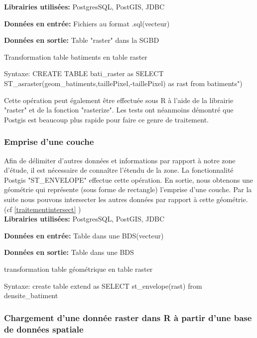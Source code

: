 \textbf{Librairies utilisées:} PostgresSQL, PostGIS, JDBC 

\textbf{Données en entrée:}  Fichiers au format .sql(vecteur)

\textbf{Données en sortie:} Table "raster" dans la SGBD \\

\begin{algorithm}[H]
\caption{\label{traitement6} Transformation table batiments en table raster}
Syntaxe:
CREATE TABLE bati\_raster as SELECT ST\_asraster(geom\_batiments,taillePixel,-taillePixel)  as rast from batiments")\\
\end{algorithm}

Cette opération peut également être effectuée sous R à l'aide de la librairie "raster" et de la fonction "rasterize". Les tests ont néanmoins démontré que Postgis est beaucoup plus rapide pour faire ce genre de traitement.

\subsubsection{Emprise d'une couche}

Afin de délimiter d'autres données et informations par rapport à notre zone d'étude, il est nécessaire de connaître l'étendu de la zone. La fonctionnalité Postgis "ST\_ENVELOPE" effectue cette opération. En sortie, nous obtenons une géométrie qui représente (sous forme de rectangle) l'emprise d'une couche. Par la suite nous pouvons intersecter les autres données par rapport à cette géométrie. (cf \ref{traitementintersect} )\\

\textbf{Librairies utilisées:} PostgresSQL, PostGIS, JDBC 

\textbf{Données en entrée:}  Table dans une BDS(vecteur)

\textbf{Données en sortie:} Table dans une BDS \\

\begin{algorithm}[H]
\caption{\label{traitementemprise} transformation table géométrique en table raster}
Syntaxe:
create table extend as SELECT st\_envelope(rast) from densite\_batiment \\
\end{algorithm}

\subsubsection{Chargement d'une donnée raster dans R à partir d'une base de données spatiale}

